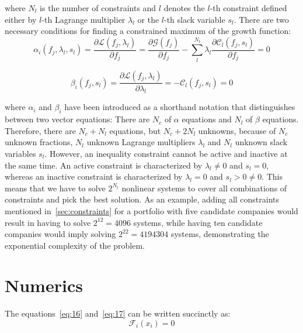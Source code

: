 \documentclass{article}
\begin{document}
\noindent where $N_l$ is the number of constraints and $l$ denotes the $l$-th
constraint defined either by $l$-th Lagrange multiplier $\lambda_l$ or the
$l$-th slack variable $s_l$. There are two necessary conditions for finding a
constrained maximum of the growth function:
\begin{equation}
\label{eq:16}
    \alpha_i(f_j, \lambda_l, s_l)
  =
    \frac{\partial \mathcal{L}(f_j, \lambda_l)}{\partial f_j}
  =
    \frac{\partial \mathcal{G}(f_j)}{\partial f_j}
  - \sum_l^{N_l} \lambda_l \frac{\partial{\mathcal{C}_l(f_j, s_l)}}{\partial f_j}
  =
    0
\end{equation}

\begin{equation}
\label{eq:17}
    \beta_i(f_j, s_l)
  =
    \frac{\partial \mathcal{L}(f_j, \lambda_l)}{\partial \lambda_l}
  =
    - \mathcal{C}_l(f_j, s_l)
  =
    0
\end{equation}

\noindent where $\alpha_i$ and $\beta_i$ have been introduced as a shorthand
notation that distinguishes between two vector equations: There are $N_c$
of $\alpha$ equations and $N_l$ of $\beta$ equations. Therefore, there are
$N_c + N_l$ equations, but $N_c + 2N_l$ unknowns, because of $N_c$ unknown
fractions, $N_l$ unknown Lagrange multipliers $\lambda_l$ and $N_l$ unknown
slack variables $s_l$. However, an inequality constraint cannot be active and
inactive at the same time. An active constraint is characterized by $\lambda_l
\neq 0$ and $s_l = 0$, whereas an inactive constraint is characterized by
$\lambda_l = 0$ and $s_l > 0 \ne 0$. This means that we have to solve $2^{N_l}$
nonlinear systems to cover all combinations of constraints and pick the best
solution. As an example, adding all constraints mentioned
in~\autoref{sec:constraints} for a portfolio with five candidate companies would
result in having to solve $2^{12} = 4 096$ systems, while having ten candidate
companies would imply solving $2^{22} = 4 194 304$ systems, demonstrating the
exponential complexity of the problem.


\section{Numerics}
\label{sec:numerics}

\noindent The equations~\eqref{eq:16} and~\eqref{eq:17} can be written
succinctly as:
\begin{equation}
\label{eq:18}
    \mathcal{F}_i(x_i) = 0
\end{equation}
\end{document}
